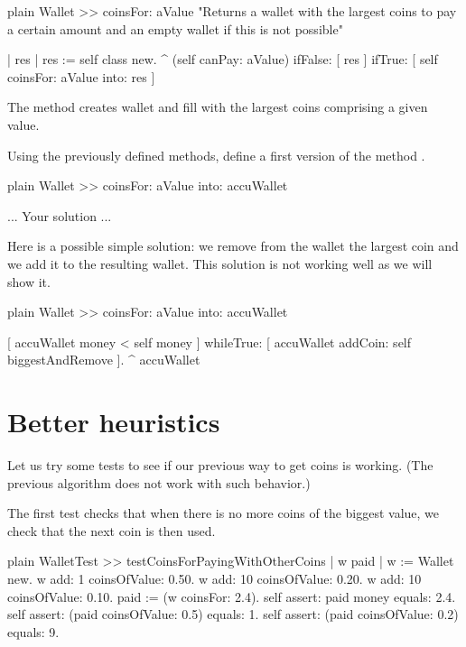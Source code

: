 \documentclass[10pt,twoside,english]{_support/latex/sbabook/sbabook}
\begin{document}
\begin{displaycode}{plain}
Wallet >> coinsFor: aValue
	"Returns a wallet with the largest coins to pay a certain amount and an empty wallet if this is not possible"
	
	| res |
	res := self class new.
	^ (self canPay: aValue)
		ifFalse: [ res ]
		ifTrue: [ self coinsFor: aValue into: res ] 
\end{displaycode}

The method  creates wallet and fill with the largest coins comprising a given value.

Using the previously defined methods, define a first version of the method .

\begin{displaycode}{plain}
Wallet >> coinsFor: aValue into: accuWallet	

	... Your solution ...
\end{displaycode}

Here is a possible simple solution: we remove from the wallet the largest coin and we add it to the resulting wallet.
This solution is not working well as we will show it.

\begin{displaycode}{plain}
Wallet >> coinsFor: aValue into: accuWallet	
	
	[ accuWallet money < self money ]
			whileTrue: [ accuWallet addCoin: self biggestAndRemove ].
	^ accuWallet
\end{displaycode}
\section{Better heuristics}
Let us try some tests to see if our previous way to get coins is working. (The previous algorithm does not work with such behavior.) 

The first test checks that when there is no more coins of the biggest value, we check that the next coin
is then used. 

\begin{displaycode}{plain}
WalletTest >> testCoinsForPayingWithOtherCoins
	| w paid |
	w := Wallet new.
	w add: 1 coinsOfValue: 0.50.
	w add: 10 coinsOfValue: 0.20.
	w add: 10 coinsOfValue: 0.10.
	paid := (w coinsFor: 2.4).
	self assert: paid money equals: 2.4.
	self assert: (paid coinsOfValue: 0.5) equals: 1.
	self assert: (paid coinsOfValue: 0.2) equals: 9.
\end{displaycode}
\end{document}
